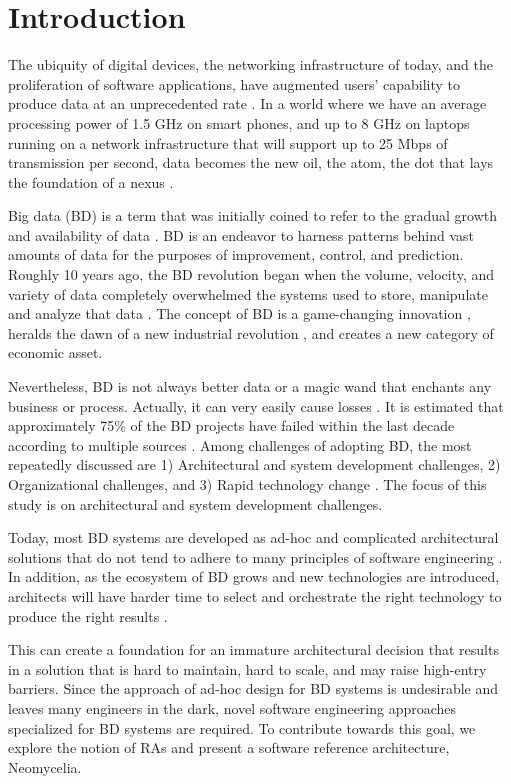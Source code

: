 \documentclass[conference]{IEEEtran}
\begin{document}
\section{Introduction}
The ubiquity of digital devices, the networking infrastructure of today, and the proliferation of software applications, have augmented users’ capability to produce data at an unprecedented rate \cite{AtaeiHype}. In a world where we have an average processing power of 1.5 GHz on smart phones, and up to 8 GHz on laptops running on a network infrastructure that will support up to 25 Mbps of transmission per second, data becomes the new oil, the atom, the dot that lays the foundation of a nexus \cite{Shafi}.

Big data (BD) is a term that was initially coined to refer to the gradual growth and availability of data \cite{lycett2013datafication}. BD is an endeavor to harness patterns behind vast amounts of data for the purposes of improvement, control, and prediction. Roughly 10 years ago, the BD revolution began when the volume, velocity, and variety of data completely overwhelmed the systems used to store, manipulate and analyze that data \cite{heudecker2014survey,AtaeiBigDataEnvirons}. The concept of BD is a game-changing innovation \cite{chen2017big}, heralds the dawn of a new industrial revolution \cite{Huberty}, and creates a new category of economic asset.

Nevertheless, BD is not always better data or a magic wand that enchants any business or process. Actually, it can very easily cause losses \cite{Ranjan}. It is estimated that approximately 75\% of the BD projects have failed within the last decade according to multiple sources \cite{Partners,analytics2016age,Nash,heudecker2014survey}. Among challenges of adopting BD, the most repeatedly discussed are 1) Architectural and system development challenges, 2) Organizational challenges, and 3) Rapid technology change \cite{chen2017big,AtaeiHype,Singh}. The focus of this study is on architectural and system development challenges.

Today, most BD systems are developed as ad-hoc and complicated architectural solutions that do not tend to adhere to many principles of software engineering \cite{Gorton,Nadal}. In addition, as the ecosystem of BD grows and new technologies are introduced, architects will have harder time to select and orchestrate the right technology to produce the right results \cite{Nadal}.

This can create a foundation for an immature architectural decision that results in a solution that is hard to maintain, hard to scale, and may raise high-entry barriers.  Since the approach of ad-hoc design for BD systems is undesirable and leaves many engineers in the dark, novel software engineering approaches specialized for BD systems are required. To contribute towards this goal, we explore the notion of RAs and present a software reference architecture, Neomycelia.
\end{document}
